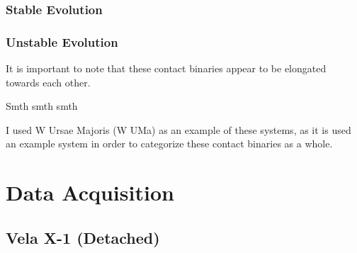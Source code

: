 \documentclass[12pt, letterpaper]{article}
\begin{document}
        \subsubsection{Stable Evolution}

        \subsubsection{Unstable Evolution}
        It is important to note that these contact binaries appear to be elongated towards each other. 

        
 

        Smth smth smth

        I used W Ursae Majoris (W UMa) as an example of these systems, as it is used an example system in order to categorize these contact binaries as a whole.

        
\section{\centering Data Acquisition}
    \subsection{\centering Vela X-1 (Detached)}
    
\end{document}
